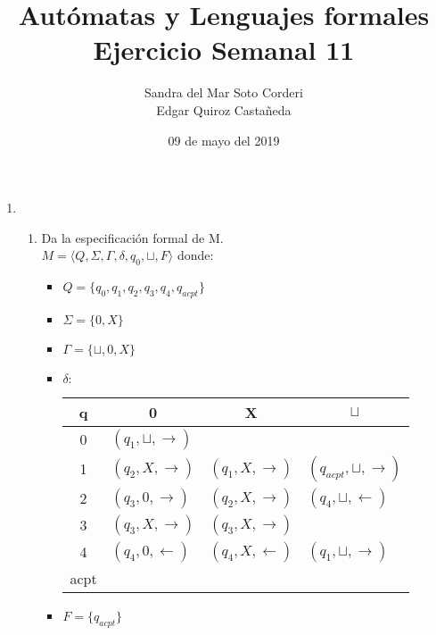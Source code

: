 \documentclass{article}
\begin{document}
    \title{
        Autómatas y Lenguajes formales \\
        Ejercicio Semanal 11
    }

    \author{
        Sandra del Mar Soto Corderi \\
        Edgar Quiroz Castañeda
    }

    \date{
        09 de mayo del 2019
    }

    \maketitle

    \begin{enumerate}
        \item {
        	\begin{enumerate}
        	\item {        	
        	Da la especificación formal de M.\\
        	
        	$M = \langle Q, \Sigma, \Gamma, \delta, q_0, \sqcup, F\rangle$ donde:\\
        	
        	\begin{itemize}
        		\item {
        		$Q = \{q_0, q_1, q_2, q_3, q_4, q_{acpt}\}$\\
        		}
        		\item {
        		$\Sigma = \{0, X\}$\\
        		}
        		\item {
        		$\Gamma = \{\sqcup, 0, X \}$
        		}
        		\item {
        		$\delta :$
        		\begin{table}[H]
        			\centering
        			\begin{tabular}{c|l|l|l}
        				q    & \multicolumn{1}{c|}{0}       & \multicolumn{1}{c|}{X}  & \multicolumn{1}{c}{$\sqcup$}      \\ \hline
        				0    & $(q_1, \sqcup, \rightarrow)$ &                         &                                   \\
        				1    & $(q_2, X, \rightarrow)$      & $(q_1, X, \rightarrow)$ & $(q_{acpt}, \sqcup, \rightarrow)$ \\
        				2    & $(q_3, 0, \rightarrow)$      & $(q_2, X, \rightarrow)$ & $(q_4, \sqcup, \leftarrow)$       \\
        				3    & $(q_3, X, \rightarrow)$      & $(q_3, X, \rightarrow)$ &                                   \\
        				4    & $(q_4, 0, \leftarrow)$       & $(q_4, X, \leftarrow)$  & $(q_1, \sqcup, \rightarrow)$      \\
        				acpt &                              &                         &                                  
        			\end{tabular}
        		\end{table}
        		}
        		\item {
        			$F = \{q_{acpt}\}$		
        		}
        	\end{itemize}
        	        	
}
\end{enumerate}}
\end{enumerate}
\end{document}

